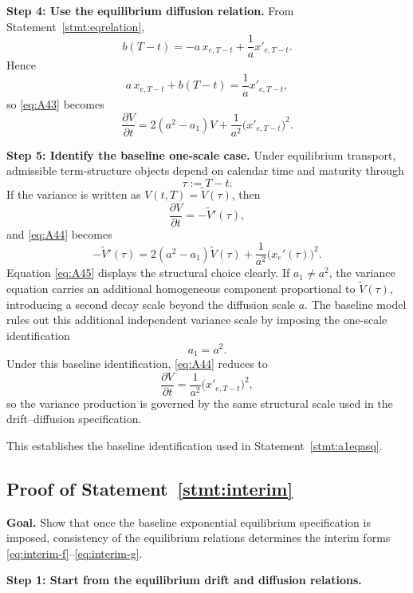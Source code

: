 \documentclass[12pt]{article}
\theoremstyle{statementstyle}
\begin{document}
\begin{appendices}
\medskip
\noindent\textbf{Step 4: Use the equilibrium diffusion relation.}
From Statement~\ref{stmt:eqrelation},
\[
b(T-t)=-a\,x_{e,T-t}+\frac{1}{a}x'_{e,T-t}.
\]
Hence
\[
a\,x_{e,T-t}+b(T-t)=\frac{1}{a}x'_{e,T-t},
\]
so \eqref{eq:A43} becomes
\[
\frac{\partial V}{\partial t}
=
2(a^2-a_1)V
+
\frac{1}{a^2}\bigl(x'_{e,T-t}\bigr)^2.
\tag{A.4.4}\label{eq:A44}
\]

\medskip
\noindent\textbf{Step 5: Identify the baseline one-scale case.}
Under equilibrium transport, admissible term-structure objects depend on calendar
time and maturity through
\[
\tau:=T-t.
\]
If the variance is written as \(V(t,T)=\widetilde V(\tau)\), then
\[
\frac{\partial V}{\partial t}=-\widetilde V'(\tau),
\]
and \eqref{eq:A44} becomes
\[
-\widetilde V'(\tau)
=
2(a^2-a_1)\widetilde V(\tau)
+
\frac{1}{a^2}\bigl(x_e'(\tau)\bigr)^2.
\tag{A.4.5}\label{eq:A45}
\]
Equation \eqref{eq:A45} displays the structural choice clearly. If
\(a_1\neq a^2\), the variance equation carries an additional homogeneous
component proportional to \(\widetilde V(\tau)\), introducing a second decay scale
beyond the diffusion scale \(a\). The baseline model rules out this additional
independent variance scale by imposing the one-scale identification
\[
a_1=a^2.
\tag{A.4.6}\label{eq:A46}
\]
Under this baseline identification, \eqref{eq:A44} reduces to
\[
\frac{\partial V}{\partial t}
=
\frac{1}{a^2}\bigl(x'_{e,T-t}\bigr)^2,
\]
so the variance production is governed by the same structural scale used in the
drift--diffusion specification.

This establishes the baseline identification used in Statement~\ref{stmt:a1eqasq}.

\subsection{Proof of Statement~\ref{stmt:interim}}
\label{appendix:A5}

\textbf{Goal.}
Show that once the baseline exponential equilibrium specification is
imposed, consistency of the equilibrium relations determines the interim
forms \eqref{eq:interim-f}--\eqref{eq:interim-g}.

\medskip
\noindent\textbf{Step 1: Start from the equilibrium drift and diffusion relations.}


\end{appendices}
\end{document}
